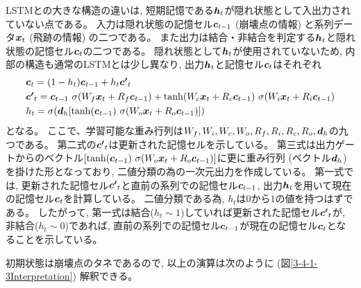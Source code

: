 LSTMとの大きな構造の違いは, 短期記憶である${\mbox{\boldmath{$h$}}}_t$が隠れ状態として入出力されていない点である。
入力は隠れ状態の記憶セル${\mbox{\boldmath{$c$}}}_{t-1}$ (崩壊点の情報) と系列データ${\mbox{\boldmath{$x$}}}_t$ (飛跡の情報) の二つである。
また出力は結合・非結合を判定する${\mbox{\boldmath{$h$}}}_t$と隠れ状態の記憶セル${\mbox{\boldmath{$c$}}}_{t}$の二つである。
隠れ状態として${\mbox{\boldmath{$h$}}}_t$が使用されていないため, 内部の構造も通常のLSTMとは少し異なり, 出力${\mbox{\boldmath{$h$}}}_{t}$と記憶セル${\mbox{\boldmath{$c$}}}_{t}$はそれぞれ
\begin{equation}
 \begin{split}
  &{\mbox{\boldmath{$c$}}}_{t} 
  = (1-h_t) {\mbox{\boldmath{$c$}}}_{t-1} + h_t {\mbox{\boldmath{$c'$}}}_{t}\\
  &{\mbox{\boldmath{$c'$}}}_{t}
  = {\mbox{\boldmath{$c$}}}_{t-1} \  \sigma (W_f {\mbox{\boldmath{$x$}}}_t + R_f {\mbox{\boldmath{$c$}}}_{t-1}) 
  + \tanh (W_c {\mbox{\boldmath{$x$}}}_t + R_c {\mbox{\boldmath{$c$}}}_{t-1}) \  \sigma (W_i {\mbox{\boldmath{$x$}}}_t + R_i {\mbox{\boldmath{$c$}}}_{t-1})\\
  &h_{t} 
  = \sigma ({\mbox{\boldmath{$d$}}}_h [\tanh({\mbox{\boldmath{$c$}}}_{t-1}) \  \sigma (W_o {\mbox{\boldmath{$x$}}}_t + R_o {\mbox{\boldmath{$c$}}}_{t-1}) ])
 \end{split}
\end{equation}
となる。
ここで、学習可能な重み行列は$W_f, W_i, W_c, W_o, R_f, R_i, R_c, R_o, {\mbox{\boldmath{$d$}}}_h$の九つである。
第二式の${\mbox{\boldmath{$c'$}}}_{t}$は更新された記憶セルを示している。
第三式は出力ゲートからのベクトル$[\tanh({\mbox{\boldmath{$c$}}}_{t-1}) \  \sigma (W_o {\mbox{\boldmath{$x$}}}_t + R_o {\mbox{\boldmath{$c$}}}_{t-1})]$に更に重み行列 (ベクトル${\mbox{\boldmath{$d$}}}_h$) を掛けた形となっており, 二値分類の為の一次元出力を作成している。
第一式では, 更新された記憶セル${\mbox{\boldmath{$c'$}}}_{t}$と直前の系列での記憶セル${\mbox{\boldmath{$c$}}}_{t-1}$, 出力${\mbox{\boldmath{$h$}}}_{t}$を用いて現在の記憶セル${\mbox{\boldmath{$c$}}}_{t}$を計算している。
二値分類である為, $h_{t}$は$0$から$1$の値を持つはずである。
したがって, 第一式は結合($h_{t} \sim 1$)していれば更新された記憶セル${\mbox{\boldmath{$c'$}}}_{t}$が, 非結合($h_{t} \sim 0$)であれば, 直前の系列での記憶セル${\mbox{\boldmath{$c$}}}_{t-1}$が現在の記憶セル${\mbox{\boldmath{$c$}}}_{t}$となることを示している。

\newpage

初期状態は崩壊点のタネであるので, 以上の演算は次のように (図\ref{3-4-1-3Interpretation}) 解釈できる。

